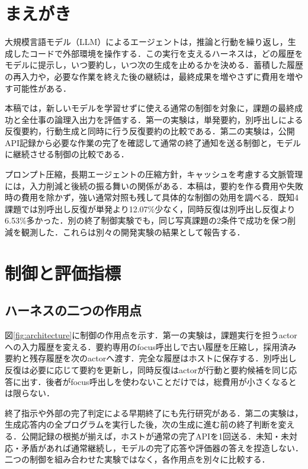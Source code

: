 \documentclass[letter]{ieicej}
\begin{document}
\maketitle


\section{まえがき}
大規模言語モデル（LLM）によるエージェントは，推論と行動を繰り返し\cite{yao2023react}，生成したコードで外部環境を操作する\cite{wang2024codeact}．この実行を支えるハーネスは，どの履歴をモデルに提示し，いつ要約し，いつ次の生成を止めるかを決める．蓄積した履歴の再入力や，必要な作業を終えた後の継続は，最終成果を増やさずに費用を増やす可能性がある．

本稿では，新しいモデルを学習せずに使える通常の制御を対象に，課題の最終成功と全仕事の論理入出力を評価する．第一の実験は，単発要約，別呼出しによる反復要約，行動生成と同時に行う反復要約の比較である．第二の実験は，公開API記録から必要な作業の完了を確認して通常の終了通知を送る制御と，モデルに継続させる制御の比較である．

プロンプト圧縮\cite{jiang2024longllmlingua}，長期エージェントの圧縮方針\cite{kang2026acon}，キャッシュを考慮する文脈管理\cite{xu2026tokenpilot}には，入力削減と後続の振る舞いの関係がある．本稿は，要約を作る費用や失敗時の費用を除かず，強い通常対照も残して具体的な制御の効用を調べる．既知4課題では別呼出し反復が単発より12.07\%少なく，同時反復は別呼出し反復より6.53\%多かった．別の終了制御実験でも，同じ写真課題の2条件で成功を保つ削減を観測した．これらは別々の開発実験の結果として報告する．

\section{制御と評価指標}
\subsection{ハーネスの二つの作用点}
図\ref{fig:architecture}に制御の作用点を示す．第一の実験は，課題実行を担うactorへの入力履歴を変える．要約専用のfocus呼出しで古い履歴を圧縮し，採用済み要約と残存履歴を次のactorへ渡す．完全な履歴はホストに保存する．別呼出し反復は必要に応じて要約を更新し，同時反復はactorが行動と要約候補を同じ応答に出す．後者がfocus呼出しを使わないことだけでは，総費用が小さくなるとは限らない．

終了指示や外部の完了判定による早期終了にも先行研究がある\cite{lu2025runaway}．第二の実験は，生成応答内の全プログラムを実行した後，次の生成に進む前の終了判断を変える．公開記録の根拠が揃えば，ホストが通常の完了APIを1回送る．未知・未対応・矛盾があれば通常継続し，モデルの完了応答や評価器の答えを捏造しない．二つの制御を組み合わせた実験ではなく，各作用点を別々に比較する．
\end{document}
